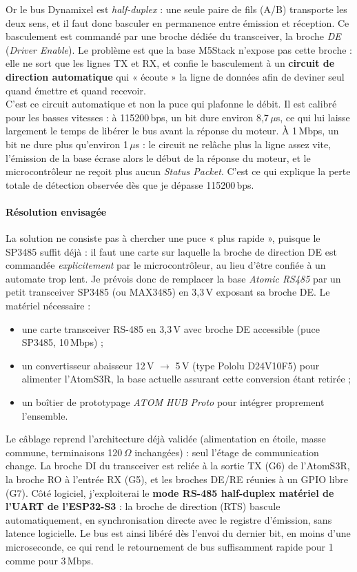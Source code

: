 \documentclass{tropLaClasse}
\begin{document}
Or le bus Dynamixel est \textit{half-duplex} : une seule paire de fils (A/B) transporte les deux sens, et il faut donc basculer en permanence entre émission et réception. Ce basculement est commandé par une broche dédiée du transceiver, la broche \textit{DE} (\textit{Driver Enable}). Le problème est que la base M5Stack n'expose pas cette broche : elle ne sort que les lignes TX et RX, et confie le basculement à un \textbf{circuit de direction automatique} qui « écoute » la ligne de données afin de deviner seul quand émettre et quand recevoir.\\

C'est ce circuit automatique et non la puce qui plafonne le débit. Il est calibré pour les basses vitesses : à 115200\,bps, un bit dure environ 8{,}7\,$\mu$s, ce qui lui laisse largement le temps de libérer le bus avant la réponse du moteur. À 1\,Mbps, un bit ne dure plus qu'environ 1\,$\mu$s : le circuit ne relâche plus la ligne assez vite, l'émission de la base écrase alors le début de la réponse du moteur, et le microcontrôleur ne reçoit plus aucun \textit{Status Packet}. C'est ce qui explique la perte totale de détection observée dès que je dépasse 115200\,bps.\\

\paragraph{Résolution envisagée}
La solution ne consiste pas à chercher une puce « plus rapide », puisque le SP3485 suffit déjà : il faut une carte sur laquelle la broche de direction DE est commandée \emph{explicitement} par le microcontrôleur, au lieu d'être confiée à un automate trop lent. Je prévois donc de remplacer la base \textit{Atomic RS485} par un petit transceiver SP3485 (ou MAX3485) en 3{,}3\,V exposant sa broche DE. Le matériel nécessaire :\\
\begin{itemize}
    \item une carte transceiver RS-485 en 3{,}3\,V avec broche DE accessible (puce SP3485, 10\,Mbps) ;
    \item un convertisseur abaisseur 12\,V $\rightarrow$ 5\,V (type Pololu D24V10F5) pour alimenter l'AtomS3R, la base actuelle assurant cette conversion étant retirée ;
    \item un boîtier de prototypage \textit{ATOM HUB Proto} pour intégrer proprement l'ensemble.
\end{itemize}

Le câblage reprend l'architecture déjà validée (alimentation en étoile, masse commune, terminaisons 120\,$\Omega$ inchangées) : seul l'étage de communication change. La broche DI du transceiver est reliée à la sortie TX (G6) de l'AtomS3R, la broche RO à l'entrée RX (G5), et les broches DE/RE réunies à un GPIO libre (G7). Côté logiciel, j'exploiterai le \textbf{mode RS-485 half-duplex matériel de l'UART de l'ESP32-S3} : la broche de direction (RTS) bascule automatiquement, en synchronisation directe avec le registre d'émission, sans latence logicielle. Le bus est ainsi libéré dès l'envoi du dernier bit, en moins d'une microseconde, ce qui rend le retournement de bus suffisamment rapide pour 1 comme pour 3\,Mbps.\\
\end{document}
